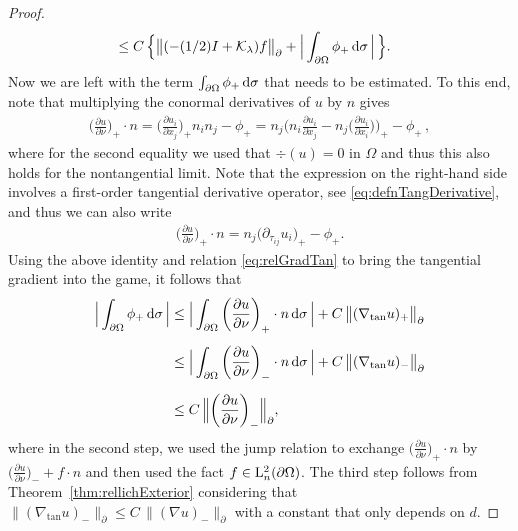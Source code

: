 \begin{proof}
\begin{align}
    \label{eq:estimatef}
    &\leq C \, \Big\{ \big\| (-(1/2)I + \mathcal{K}_\lambda) f \big\|^{}_\partial +  \Big| \int_{\partial\Omega} \phi_+ \, {\operatorname{d}\!{\sigma}} \, \Big|\,\Big\}.
  \end{align}
  Now we are left with the term $\int_{\partial\Omega} \phi_+ \, {\operatorname{d}\!{\sigma}}$ that needs to be estimated.
  To this end, note that multiplying the conormal derivatives of $u$ by $n$ gives
  \begin{align*}
    \bigg( \frac{\partial u}{\partial \nu} \bigg)_+ \cdot n
    = \bigg( \frac{\partial u_i}{\partial x_j}\bigg)_+ n_i n_j - \phi_+
    = n_j \bigg( n_i \frac{\partial u_i}{\partial x_j} - n_j \bigg( \frac{\partial u_i}{\partial x_i} \bigg) \bigg)_+ - \phi_+\, ,
  \end{align*}
  where for the second equality we used that $\div(u) = 0$ in $\Omega$ and thus this also holds for the nontangential limit.
  Note that the expression on the right-hand side involves a first-order tangential derivative operator, see \eqref{eq:defnTangDerivative}, and thus we can also write
  \begin{align*}
    \bigg( \frac{\partial u}{\partial \nu} \bigg)_+ \cdot n 
    = n_j \big( \partial_{\tau_{ij}}u_i \big)_+ - \phi_+.
  \end{align*}
  Using the above identity and relation \eqref{eq:relGradTan} to bring the tangential gradient into the game, it follows that
  \begin{align}
    \Big| \int_{\partial\Omega} \phi_+ \, {\operatorname{d}\!{\sigma}} \, \Big|
    &\leq \Big| \int_{\partial\Omega} \bigg( \frac{\partial u}{\partial \nu} \bigg)_+ \cdot n \, {\operatorname{d}\!{\sigma}} \, \Big|  + C\, \big\|(\nabla_{\mathrm{tan}} u)_+ \big\|^{}_\partial \nonumber\\[0.5em]
    &\leq \Big| \int_{\partial\Omega} \bigg( \frac{\partial u}{\partial \nu} \bigg)_- \cdot n \, {\operatorname{d}\!{\sigma}} \, \Big| +  C\, \big\| (\nabla_{\mathrm{tan}} u)_-\big\|^{}_\partial \nonumber\\[0.5em]
    \label{eq:estimatephiplus}
    &\leq C\, \Big\| \bigg( \frac{\partial u}{\partial \nu} \bigg)_- \Big\|^{}_\partial,
  \end{align}
  where in the second step, we used the jump relation to exchange $\big(\frac{\partial u}{\partial \nu}\big)_+ \cdot n$ by $\big(\frac{\partial u}{\partial \nu} \big)_- + f \cdot n$ and then used the fact $f \in \mathrm{L}^2_n(\partial\Omega)$.
  The third step follows from Theorem~\ref{thm:rellichExterior} considering that $\big\|(\nabla_{\mathrm{tan}} u)_- \big\|^{}_\partial \leq C\, \|(\nabla u)_- \|^{}_{\partial}$ with a constant that only depends on $d$.

\end{proof}
